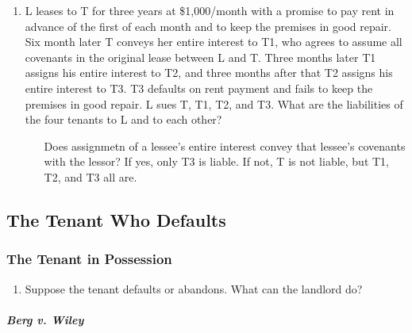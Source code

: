 \begin{enumerate}
\begin{enumerate}
        \item L leases to T for three years at \$1,000/month with a promise to 
        pay rent in advance of the first of each month and to keep the 
        premises in good repair. Six month later T conveys her entire interest 
        to T1, who agrees to assume all covenants in the original lease 
        between L and T. Three months later T1 assigns his entire interest to 
        T2, and three months after that T2 assigns his entire interest to T3. 
        T3 defaults on rent payment and fails to keep the premises in good 
        repair. L sues T, T1, T2, and T3. What are the liabilities of the four 
        tenants to L and to each other?
        \begin{enumerate}
            \item [Does assignmetn of a lessee's entire interest convey that 
            lessee's covenants with the lessor? If yes, only T3 is liable. If 
            not, T is not liable, but T1, T2, and T3 all are.]
        \end{enumerate}
    \end{enumerate}
\end{enumerate}

\subsection{The Tenant Who Defaults}

\subsubsection{The Tenant in Possession}

\begin{enumerate}
    \item Suppose the tenant defaults or abandons. What can the landlord do?
\end{enumerate}

\paragraph{\emph{Berg v. Wiley}}

